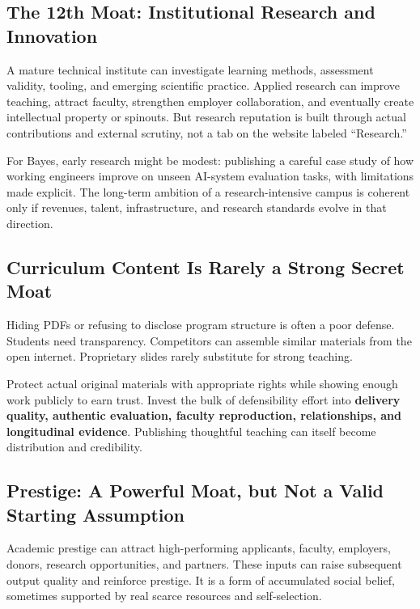 \subsection{The 12th Moat: Institutional Research and Innovation}
\label{sec:twelfth_moat_institutional_research}

A mature technical institute can investigate learning methods, assessment validity, tooling, and emerging scientific practice. Applied research can improve teaching, attract faculty, strengthen employer collaboration, and eventually create intellectual property or spinouts. But research reputation is built through actual contributions and external scrutiny, not a tab on the website labeled ``Research.''

For Bayes, early research might be modest: publishing a careful case study of how working engineers improve on unseen AI-system evaluation tasks, with limitations made explicit. The long-term ambition of a research-intensive campus is coherent only if revenues, talent, infrastructure, and research standards evolve in that direction.

\subsection{Curriculum Content Is Rarely a Strong Secret Moat}
\label{sec:curriculum_content_rarely_secret_moat}

Hiding PDFs or refusing to disclose program structure is often a poor defense. Students need transparency. Competitors can assemble similar materials from the open internet. Proprietary slides rarely substitute for strong teaching.

Protect actual original materials with appropriate rights while showing enough work publicly to earn trust. Invest the bulk of defensibility effort into \textbf{delivery quality, authentic evaluation, faculty reproduction, relationships, and longitudinal evidence}. Publishing thoughtful teaching can itself become distribution and credibility.

\subsection{Prestige: A Powerful Moat, but Not a Valid Starting Assumption}
\label{sec:prestige_late_stage_moat}

Academic prestige can attract high-performing applicants, faculty, employers, donors, research opportunities, and partners. These inputs can raise subsequent output quality and reinforce prestige. It is a form of accumulated social belief, sometimes supported by real scarce resources and self-selection.

